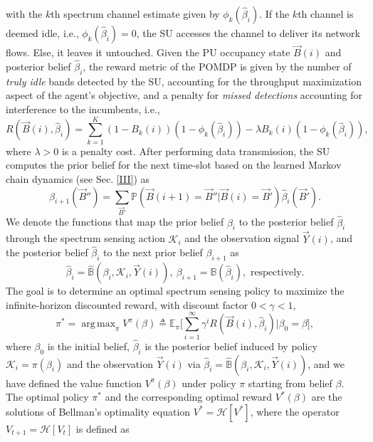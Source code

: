 \documentclass[10pt,twocolumn]{IEEEtran}
\DeclareMathOperator*{\argmax}{arg\,max}
\begin{document}
with the $k$th spectrum channel estimate given by $\phi_k(\hat{\beta}_{i})$. If  the $k$th channel is deemed idle, i.e., $\phi_{k}(\hat{\beta}_{i}){=}0$, the SU accesses the channel to deliver its network flows. Else, it leaves it untouched. Given the PU occupancy state $\vec{B}(i)$ and posterior belief $\hat\beta_i$, the reward metric of the POMDP is given by the number of \emph{truly idle} bands detected by the SU, accounting for the throughput maximization aspect of the agent's objective, and a penalty for \emph{missed detections} accounting for interference to the incumbents, i.e.,
\begin{equation}
\nonumber
    R(\vec{B}(i), \hat{\beta}_i){=}\sum_{k=1}^{K} (1{-}B_k(i))(1{-}\phi_k(\hat{\beta}_{i})){-}\lambda B_k(i)(1 - \phi_k(\hat{\beta}_i)),
\end{equation}
where $\lambda{>}0$ is a penalty cost. After performing data transmission, the SU computes the prior belief for the next time-slot based on the learned Markov chain dynamics (see Sec. \ref{III}) as
\begin{equation}\label{13}
    \beta_{i+1}(\vec{B}'')=\sum_{\vec{B}'}\mathbb{P}(\vec{B}(i+1) = \vec{B}''|\vec{B}(i)=\vec{B}')\hat{\beta}_{i}(\vec{B}').
\end{equation}
We denote the functions that map the prior belief $\beta_i$ to the posterior belief $\hat\beta_i$ through the spectrum sensing action $\mathcal K_i$ and the observation signal $\vec{Y}(i)$, and the posterior belief $\hat\beta_i$ to the next prior belief $\beta_{i+1}$ as
$$\hat\beta_i{=}\hat{\mathbb B}(\beta_i, \mathcal K_i, \vec{Y}(i)),\ \beta_{i+1}{=}{\mathbb B}(\hat\beta_i),\text{ respectively}.$$
The goal is to determine an optimal spectrum sensing policy to maximize the infinite-horizon discounted reward, with discount factor $0{<}\gamma{<}1$,
\begin{equation}\label{14}
    \pi^{*}{=}\argmax_{\pi} V^{\pi}(\beta) \triangleq \mathbb{E}_{\pi} \Big[\sum_{i=1}^{\infty} \gamma^{i} R(\vec{B}(i), \hat{\beta}_i)|\beta_0 {=}\beta\Big],
\end{equation}
where $\beta_0$ is the initial belief, $\hat\beta_i$ is the posterior belief induced by policy $\mathcal K_i{=}\pi(\beta_i)$ and the observation $\vec{Y}(i)$ via $\hat\beta_i{=}\hat{\mathbb B}(\beta_i, \mathcal K_i, \vec{Y}(i))$, and we have defined the value function $V^{\pi}(\beta)$ under policy $\pi$ starting from belief $\beta$.
The optimal policy $\pi^*$ and the corresponding optimal reward $V^*(\beta)$ are the solutions of Bellman's optimality equation $V^*{=}\mathcal{H}[V^*]$, where the operator $V_{t+1}{=}\mathcal {H}[V_{t}]$ is defined as
\end{document}
